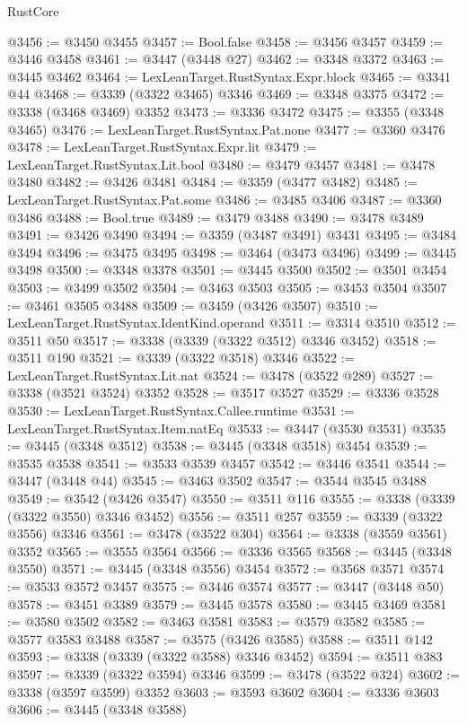 \begin{lexlean}{RustCore}
\begin{coremodule}
@3456 := @3450 @3455
@3457 := Bool.false
@3458 := @3456 @3457
@3459 := @3446 @3458
@3461 := @3447 (@3448 @27)
@3462 := @3348 @3372
@3463 := @3445 @3462
@3464 := LexLeanTarget.RustSyntax.Expr.block
@3465 := @3341 @44
@3468 := @3339 (@3322 @3465) @3346
@3469 := @3348 @3375
@3472 := @3338 (@3468 @3469) @3352
@3473 := @3336 @3472
@3475 := @3355 (@3348 @3465)
@3476 := LexLeanTarget.RustSyntax.Pat.none
@3477 := @3360 @3476
@3478 := LexLeanTarget.RustSyntax.Expr.lit
@3479 := LexLeanTarget.RustSyntax.Lit.bool
@3480 := @3479 @3457
@3481 := @3478 @3480
@3482 := @3426 @3481
@3484 := @3359 (@3477 @3482)
@3485 := LexLeanTarget.RustSyntax.Pat.some
@3486 := @3485 @3406
@3487 := @3360 @3486
@3488 := Bool.true
@3489 := @3479 @3488
@3490 := @3478 @3489
@3491 := @3426 @3490
@3494 := @3359 (@3487 @3491) @3431
@3495 := @3484 @3494
@3496 := @3475 @3495
@3498 := @3464 (@3473 @3496)
@3499 := @3445 @3498
@3500 := @3348 @3378
@3501 := @3445 @3500
@3502 := @3501 @3454
@3503 := @3499 @3502
@3504 := @3463 @3503
@3505 := @3453 @3504
@3507 := @3461 @3505 @3488
@3509 := @3459 (@3426 @3507)
@3510 := LexLeanTarget.RustSyntax.IdentKind.operand
@3511 := @3314 @3510
@3512 := @3511 @50
@3517 := @3338 (@3339 (@3322 @3512) @3346 @3452)
@3518 := @3511 @190
@3521 := @3339 (@3322 @3518) @3346
@3522 := LexLeanTarget.RustSyntax.Lit.nat
@3524 := @3478 (@3522 @289)
@3527 := @3338 (@3521 @3524) @3352
@3528 := @3517 @3527
@3529 := @3336 @3528
@3530 := LexLeanTarget.RustSyntax.Callee.runtime
@3531 := LexLeanTarget.RustSyntax.Item.natEq
@3533 := @3447 (@3530 @3531)
@3535 := @3445 (@3348 @3512)
@3538 := @3445 (@3348 @3518) @3454
@3539 := @3535 @3538
@3541 := @3533 @3539 @3457
@3542 := @3446 @3541
@3544 := @3447 (@3448 @44)
@3545 := @3463 @3502
@3547 := @3544 @3545 @3488
@3549 := @3542 (@3426 @3547)
@3550 := @3511 @116
@3555 := @3338 (@3339 (@3322 @3550) @3346 @3452)
@3556 := @3511 @257
@3559 := @3339 (@3322 @3556) @3346
@3561 := @3478 (@3522 @304)
@3564 := @3338 (@3559 @3561) @3352
@3565 := @3555 @3564
@3566 := @3336 @3565
@3568 := @3445 (@3348 @3550)
@3571 := @3445 (@3348 @3556) @3454
@3572 := @3568 @3571
@3574 := @3533 @3572 @3457
@3575 := @3446 @3574
@3577 := @3447 (@3448 @50)
@3578 := @3451 @3389
@3579 := @3445 @3578
@3580 := @3445 @3469
@3581 := @3580 @3502
@3582 := @3463 @3581
@3583 := @3579 @3582
@3585 := @3577 @3583 @3488
@3587 := @3575 (@3426 @3585)
@3588 := @3511 @142
@3593 := @3338 (@3339 (@3322 @3588) @3346 @3452)
@3594 := @3511 @383
@3597 := @3339 (@3322 @3594) @3346
@3599 := @3478 (@3522 @324)
@3602 := @3338 (@3597 @3599) @3352
@3603 := @3593 @3602
@3604 := @3336 @3603
@3606 := @3445 (@3348 @3588)

\end{coremodule}
\end{lexlean}
